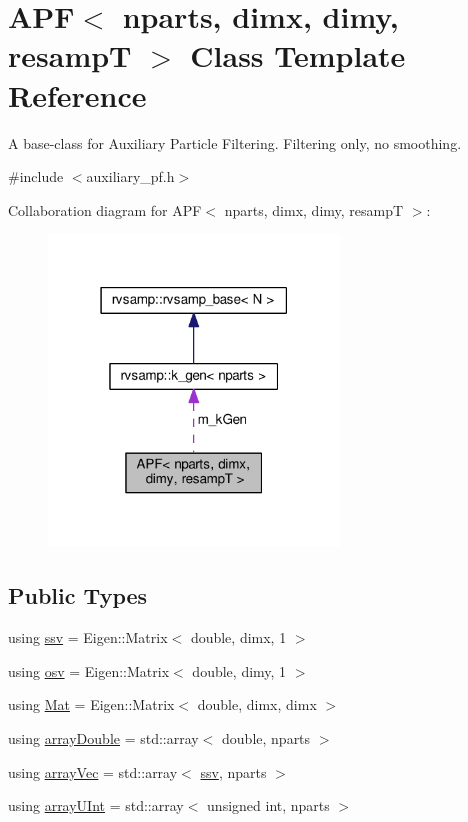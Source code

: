 \hypertarget{classAPF}{}\section{A\+PF$<$ nparts, dimx, dimy, resampT $>$ Class Template Reference}
\label{classAPF}


A base-\/class for Auxiliary Particle Filtering. Filtering only, no smoothing.  




{\ttfamily \#include $<$auxiliary\+\_\+pf.\+h$>$}



Collaboration diagram for A\+PF$<$ nparts, dimx, dimy, resampT $>$\+:\nopagebreak
\begin{figure}[H]
\begin{center}
\leavevmode
\includegraphics[width=219pt]{classAPF__coll__graph}
\end{center}
\end{figure}
\subsection*{Public Types}
\begin{DoxyCompactItemize}
\item 
using \hyperlink{classAPF_add8c737c90d68dc165d1e60dcd6b3b20}{ssv} = Eigen\+::\+Matrix$<$ double, dimx, 1 $>$
\item 
using \hyperlink{classAPF_aa3975009cab0e9e8945862884f091620}{osv} = Eigen\+::\+Matrix$<$ double, dimy, 1 $>$
\item 
using \hyperlink{classAPF_a8e867c46870835e2103aee00f13f0be7}{Mat} = Eigen\+::\+Matrix$<$ double, dimx, dimx $>$
\item 
using \hyperlink{classAPF_a004eb76b0bd0c79820674bdeb5a6c2c1}{array\+Double} = std\+::array$<$ double, nparts $>$
\item 
using \hyperlink{classAPF_a58fdbb8fc5629feb9bb5fe9a9de19554}{array\+Vec} = std\+::array$<$ \hyperlink{classAPF_add8c737c90d68dc165d1e60dcd6b3b20}{ssv}, nparts $>$
\item 
using \hyperlink{classAPF_a43238fa97dbb1862121ea2aa6f2a9dd1}{array\+U\+Int} = std\+::array$<$ unsigned int, nparts $>$
\end{DoxyCompactItemize}
